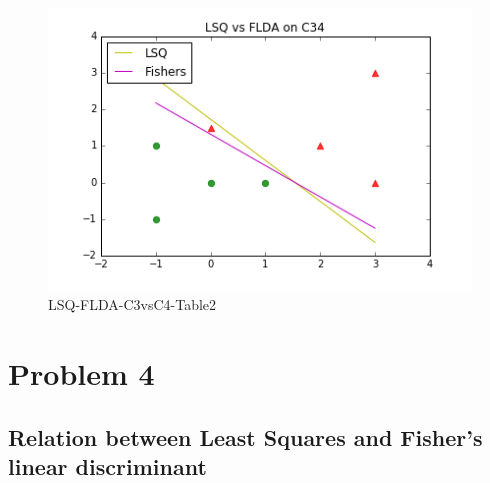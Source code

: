 \documentclass[10pt,a4paper]{article}
\begin{document}
\graphicspath{ {/images/} }
\begin{figure}[!h]
\includegraphics[scale=0.75]{images/LsqvsFLDA_C34.png}	
  \caption{LSQ-FLDA-C3vsC4-Table2}
  \label{fig:C34T2}
\end{figure}
\section{Problem 4}
\subsection{Relation between Least Squares and
Fisher's linear discriminant}
\end{document}
